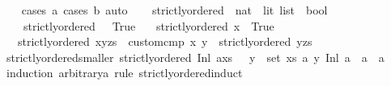 \begin{isabellebody}
%
\isadelimproof
\ \ %
\endisadelimproof
%
\isatagproof
{}\isamarkupfalse%
\ {\isacharparenleft}{\kern0pt}cases\ a{\isacharcomma}{\kern0pt}\ cases\ b{\isacharparenright}{\kern0pt}\ auto%
\endisatagproof
{\isafoldproof}%
%
\isadelimproof
\ \ \isanewline
%
\endisadelimproof
\isanewline
{}\isamarkupfalse%
\ strictly{\isacharunderscore}{\kern0pt}ordered\ {\isacharcolon}{\kern0pt}{\isacharcolon}{\kern0pt}\ {\isachardoublequoteopen}{\isacharparenleft}{\kern0pt}nat\ {\isacharplus}{\kern0pt}\ lit{\isacharparenright}{\kern0pt}\ list\ {\isasymRightarrow}\ bool{\isachardoublequoteclose}\isanewline
\ \ \ \isanewline
\ \ \ \ {\isachardoublequoteopen}strictly{\isacharunderscore}{\kern0pt}ordered\ {\isacharbrackleft}{\kern0pt}{\isacharbrackright}{\kern0pt}\ {\isacharequal}{\kern0pt}\ True{\isachardoublequoteclose}\isanewline
\ \ {\isacharbar}{\kern0pt}\ {\isachardoublequoteopen}strictly{\isacharunderscore}{\kern0pt}ordered\ {\isacharbrackleft}{\kern0pt}x{\isacharbrackright}{\kern0pt}\ {\isacharequal}{\kern0pt}\ True{\isachardoublequoteclose}\isanewline
\ \ {\isacharbar}{\kern0pt}\ {\isachardoublequoteopen}strictly{\isacharunderscore}{\kern0pt}ordered\ {\isacharparenleft}{\kern0pt}x{\isacharhash}{\kern0pt}y{\isacharhash}{\kern0pt}zs{\isacharparenright}{\kern0pt}\ {\isacharequal}{\kern0pt}\ {\isacharparenleft}{\kern0pt}custom{\isacharunderscore}{\kern0pt}cmp\ x\ y\ {\isasymand}\ strictly{\isacharunderscore}{\kern0pt}ordered\ {\isacharparenleft}{\kern0pt}y{\isacharhash}{\kern0pt}zs{\isacharparenright}{\kern0pt}{\isacharparenright}{\kern0pt}{\isachardoublequoteclose}\isanewline
\isanewline
{}\isamarkupfalse%
\ strictly{\isacharunderscore}{\kern0pt}ordered{\isacharunderscore}{\kern0pt}smaller{\isacharcolon}{\kern0pt}\ {\isachardoublequoteopen}strictly{\isacharunderscore}{\kern0pt}ordered\ {\isacharparenleft}{\kern0pt}{\isacharparenleft}{\kern0pt}Inl\ a{\isacharparenright}{\kern0pt}{\isacharhash}{\kern0pt}xs{\isacharparenright}{\kern0pt}\ {\isasymLongrightarrow}\ {\isacharparenleft}{\kern0pt}{\isasymforall}\ y\ {\isasymin}\ {\isacharparenleft}{\kern0pt}set\ xs{\isacharparenright}{\kern0pt}{\isachardot}{\kern0pt}\ {\isasymexists}a{\isacharprime}{\kern0pt}{\isachardot}{\kern0pt}\ y{\isacharequal}{\kern0pt}\ Inl\ a{\isacharprime}{\kern0pt}\ {\isasymand}\ a\ {\isacharless}{\kern0pt}\ a{\isacharprime}{\kern0pt}{\isacharparenright}{\kern0pt}{\isachardoublequoteclose}\isanewline
%
\isadelimproof
%
\endisadelimproof
%
\isatagproof
{}\isamarkupfalse%
\ {\isacharparenleft}{\kern0pt}induction\ arbitrary{\isacharcolon}{\kern0pt}a\ rule{\isacharcolon}{\kern0pt}\ strictly{\isacharunderscore}{\kern0pt}ordered{\isachardot}{\kern0pt}induct{\isacharparenright}{\kern0pt}\isanewline

\end{isabellebody}
